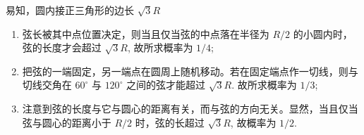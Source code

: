 \documentclass[Prob-All.tex]{subfiles}
\begin{document}
\begin{frame}
		{\small \jieda 易知，圆内接正三角形的边长 $\sqrt{3}R$
			\begin{enumerate}[<+-|alert@+>]
				\item[a]弦长被其中点位置决定，则当且仅当弦的中点落在半径为 $R/2$ 的小圆内时，弦的长度才会超过 $\sqrt{3} R$, 故所求概率为 $1/4$;
				\item[b] 把弦的一端固定，另一端点在圆周上随机移动。若在固定端点作一切线，则与切线交角在 $60^\circ$ 与 $120^\circ$ 之间的弦才能超过 $\sqrt{3} R$. 故所求概率为 $1/3$;
				\item[c] 注意到弦的长度与它与圆心的距离有关，而与弦的方向无关。显然，当且仅当弦与圆心的距离小于 $R/2$ 时，弦的长超过 $\sqrt{3} R$, 故概率为 $1/2$.



			\end{enumerate}
		}
	\end{frame}
%
\end{document}
